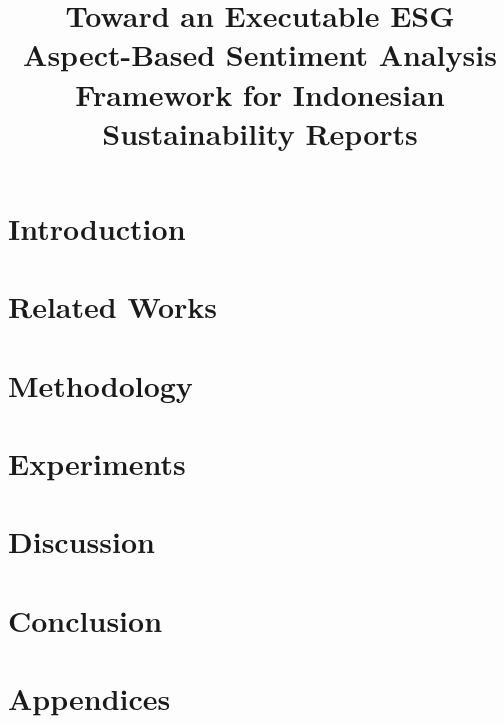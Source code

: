 \documentclass[english, online, cse, master]{dithesis}
\title{Toward an Executable ESG Aspect-Based Sentiment Analysis Framework for Indonesian Sustainability Reports}
\begin{document}
\pagestyle{empty}
\maketitlepage

 {
  
  
}

\contents %


    
\mainmatter

\chapter{Introduction} %
  \label{introduction} %
    
\chapter{Related Works}
  \label{relatedwork}
  
    
\chapter{Methodology}
  \label{implementation}
  
    
\chapter{Experiments}
  \label{experiments}
  

\chapter{Discussion}
  \label{discussion}
  
  
\chapter{Conclusion}
  \label{summary}
  
    
\printbibliography[heading=bibnumbered, title=\mybibname]

\startappendix
\chapter{Appendices}
  
\end{document}
